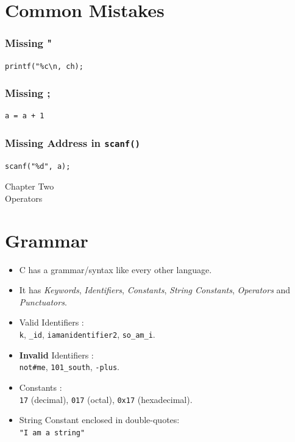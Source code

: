\documentclass[a4,portraitt]{slides}
\begin{document}
\newpage
\section*{Common Mistakes}

\subsubsection*{Missing "}
\begin{verbatim}
printf("%c\n, ch);
\end{verbatim}

\subsubsection*{Missing ;}
\begin{verbatim}
a = a + 1
\end{verbatim}

\subsubsection*{Missing Address in {\tt scanf()}}
\begin{verbatim}
scanf("%d", a);
\end{verbatim}

\newpage
\begin{center}
{\Large Chapter Two \\ Operators}
\end{center}

\section*{Grammar}


\begin{itemize}
\item  C has a grammar/syntax like every other language.
\item  It has {\it Keywords}, {\it Identifiers}, {\it Constants}, {\it String Constants}, {\it Operators} and {\it Punctuators}.
\item
Valid Identifiers :\\
\verb^k^,
\verb^_id^,
\verb^iamanidentifier2^,
\verb^so_am_i^.
\item  {\bf Invalid} Identifiers :\\
\verb^not#me^,
\verb^101_south^,
\verb^-plus^.
\item  Constants :\\
\verb^17^ (decimal),
\verb^017^ (octal),
\verb^0x17^ (hexadecimal).
\item  String Constant enclosed in double-quotes:\\
\verb^"I am a string"^
\end{itemize}
\end{document}
